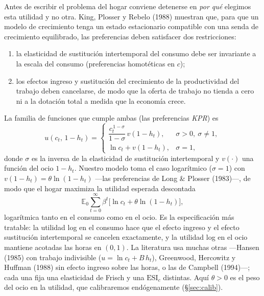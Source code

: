 \documentclass[11pt,a4paper]{report}
\newcommand{\E}{\mathbb{E}}
\begin{document}
Antes de escribir el problema del hogar conviene detenerse en \emph{por qué} elegimos
esta utilidad y no otra. King, Plosser y Rebelo (1988) muestran que, para que un
modelo de crecimiento tenga un estado estacionario compatible con una senda de
crecimiento equilibrado, las preferencias deben satisfacer dos restricciones:
\begin{enumerate}[label=(\roman*), leftmargin=2.2em, topsep=2pt, itemsep=2pt]
\item la elasticidad de sustitución intertemporal del consumo debe ser invariante a
  la escala del consumo (preferencias homotéticas en $c$);
\item los efectos ingreso y sustitución del crecimiento de la productividad del
  trabajo deben cancelarse, de modo que la oferta de trabajo no tienda a cero ni a la
  dotación total a medida que la economía crece.
\end{enumerate}
La familia de funciones que cumple ambas (las preferencias \emph{KPR}) es
\begin{equation}
u(c_t,\,1-h_t)=
\begin{cases}
\dfrac{c_t^{\,1-\sigma}}{1-\sigma}\,v(1-h_t), & \sigma>0,\ \sigma\neq 1,\\[8pt]
\ln c_t + v(1-h_t), & \sigma=1,
\end{cases}
\label{eq:kpr}
\end{equation}
donde $\sigma$ es la inversa de la elasticidad de sustitución intertemporal y
$v(\cdot)$ una función del ocio $1-h_t$. Nuestro modelo toma el caso logarítmico
($\sigma=1$) con $v(1-h_t)=\theta\ln(1-h_t)$ ---las preferencias de Long \&
Plosser (1983)---, de modo que el hogar maximiza la utilidad esperada descontada
\begin{equation}
\E_0 \sum_{t=0}^{\infty}\beta^t\big[\ln c_t + \theta\ln(1-h_t)\big],
\label{eq:utility}
\end{equation}
logarítmica tanto en el consumo como en el ocio. Es la especificación más tratable:
la utilidad log en el consumo hace que el efecto ingreso y el efecto sustitución
intertemporal se cancelen exactamente, y la utilidad log en el ocio mantiene acotadas
las horas en $(0,1)$. La literatura usa muchas otras ---Hansen (1985) con trabajo
indivisible ($u=\ln c_t + B\,h_t$), Greenwood, Hercowitz y Huffman (1988) sin efecto
ingreso sobre las horas, o las de Campbell (1994)---; cada una fija una elasticidad de
Frisch y una $\mathrm{ESI}_c$ distintas. Aquí $\theta>0$ es el peso del ocio en la
utilidad, que calibraremos endógenamente (\S\ref{sec:calib}).
\end{document}
